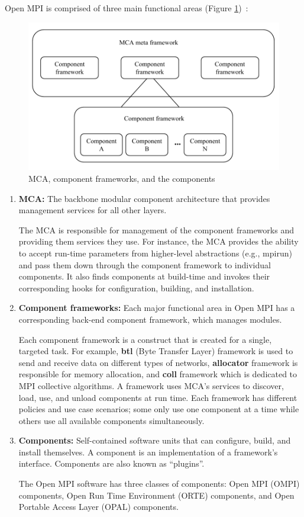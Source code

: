 Open MPI is comprised of three main functional areas (Figure \ref{fig:MCA_framework})~\cite{graham2006open}:

\begin{figure}[h!]
\centering
\includegraphics[scale=0.4]{images/MCA_framework.png}
\caption{MCA, component frameworks, and the components}
\label{fig:MCA_framework}
\end{figure}

\begin{enumerate}
\item \textbf {MCA:} The backbone modular component architecture that provides management services for all other layers.
  
  The MCA is responsible for management of the component frameworks and providing them services they use. For instance, the MCA provides the ability to accept run-time parameters from higher-level abstractions (e.g., mpirun) and pass them down through the component framework to individual components. It also finds components at build-time and invokes their corresponding hooks for configuration, building, and installation.
  
\item \textbf{Component frameworks:} Each major functional area in Open MPI has a corresponding back-end component framework, which manages modules.
  
  Each component framework is a construct that is created for a single, targeted task. For example, \textbf{btl} (Byte Transfer Layer) framework is used to send and receive data on different types of networks, \textbf{allocator} framework is responsible for memory allocation, and \textbf{coll} framework which is dedicated to MPI collective algorithms. A framework uses MCA's services to discover, load, use, and unload components at run time. Each framework has different policies and use case scenarios; some only use one component at a time while others use all available components simultaneously.

\item \textbf {Components:} Self-contained software units that can configure, build, and install themselves. A component is an implementation of a framework's interface. Components are also known as ``plugins''.

  The Open MPI software has three classes of components: Open MPI (OMPI) components, Open Run Time Environment (ORTE) components, and Open Portable Access Layer (OPAL) components.
\end{enumerate}



